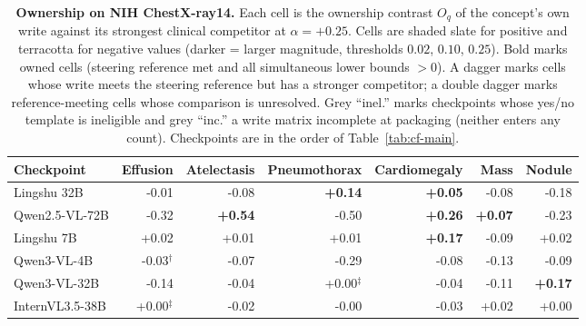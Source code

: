 \begin{table}[h]
\centering
\scriptsize
\setlength{\tabcolsep}{4pt}
\renewcommand{\arraystretch}{1.08}

\caption{\textbf{Ownership on NIH ChestX-ray14.} Each cell is the ownership contrast $O_q$ of the concept's own write against its strongest clinical competitor at $\alpha=+0.25$. Cells are shaded slate for positive and terracotta for negative values (darker = larger magnitude, thresholds $0.02$, $0.10$, $0.25$). Bold marks owned cells (steering reference met and all simultaneous lower bounds $>0$). A dagger marks cells whose write meets the steering reference but has a stronger competitor; a double dagger marks reference-meeting cells whose comparison is unresolved. Grey ``inel.'' marks checkpoints whose yes/no template is ineligible and grey ``inc.'' a write matrix incomplete at packaging (neither enters any count). Checkpoints are in the order of Table~\ref{tab:cf-main}.}
\label{tab:cf-own-nih}
\begin{tabular}{lrrrrrr}
\toprule
Checkpoint & Effusion & Atelectasis & Pneumothorax & Cardiomegaly & Mass & Nodule \\
\midrule
Lingshu 32B & \cellcolor{cfTerra1}-0.01 & \cellcolor{cfTerra2}-0.08 & \cellcolor{cfSlate3}\textbf{+0.14} & \cellcolor{cfSlate2}\textbf{+0.05} & \cellcolor{cfTerra2}-0.08 & \cellcolor{cfTerra3}-0.18 \\
Qwen2.5-VL-72B & \cellcolor{cfTerra4}-0.32 & \cellcolor{cfSlate4}\textbf{+0.54} & \cellcolor{cfTerra4}-0.50 & \cellcolor{cfSlate4}\textbf{+0.26} & \cellcolor{cfSlate2}\textbf{+0.07} & \cellcolor{cfTerra3}-0.23 \\
Lingshu 7B & \cellcolor{cfSlate1}+0.02 & \cellcolor{cfSlate1}+0.01 & \cellcolor{cfSlate1}+0.01 & \cellcolor{cfSlate3}\textbf{+0.17} & \cellcolor{cfTerra2}-0.09 & \cellcolor{cfSlate1}+0.02 \\
Qwen3-VL-4B & \cellcolor{cfTerra2}-0.03$^{\dagger}$ & \cellcolor{cfTerra2}-0.07 & \cellcolor{cfTerra4}-0.29 & \cellcolor{cfTerra2}-0.08 & \cellcolor{cfTerra3}-0.13 & \cellcolor{cfTerra2}-0.09 \\
Qwen3-VL-32B & \cellcolor{cfTerra3}-0.14 & \cellcolor{cfTerra2}-0.04 & \cellcolor{cfSlate1}+0.00$^{\ddagger}$ & \cellcolor{cfTerra2}-0.04 & \cellcolor{cfTerra3}-0.11 & \cellcolor{cfSlate3}\textbf{+0.17} \\
InternVL3.5-38B & \cellcolor{cfSlate1}+0.00$^{\ddagger}$ & \cellcolor{cfTerra1}-0.02 & \cellcolor{cfTerra1}-0.00 & \cellcolor{cfTerra2}-0.03 & \cellcolor{cfSlate1}+0.02 & \cellcolor{cfSlate1}+0.00 \\

\end{tabular}
\end{table}
